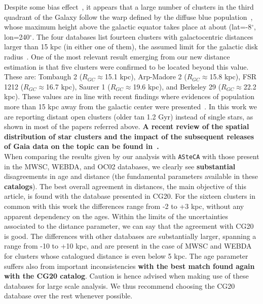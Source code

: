 \documentclass[referee]{aa}
\begin{document}
  Despite some bias effect~\citep[e.g. lower dust absorption, particularly
  along the Fitzgerald window][]{Fitzgerald_1968}, it appears that a large
  number of clusters in the third quadrant of the Galaxy follow the warp defined
  by the diffuse blue population~\citep{Carraro_2005_detection,Moitinho_2006},
  whose maximum height above the galactic equator takes place at about
  (lat=-8$^{\circ}$, lon=240$^{\circ}$.
  The four databases list fourteen clusters with galactocentric distances larger
  than 15 kpc (in either one of them), the assumed limit for the galactic disk
  radius~\citep[see][and references therein]{Carraro_2010}.
  One of the most relevant result emerging from our new distance estimation is
  that five clusters were confirmed to be located beyond this value.
  These are: Tombaugh 2 ($R_{GC}\approx$15.1 kpc), Arp-Madore 2
  ($R_{GC}\approx$15.8 kpc), FSR 1212 ($R_{GC}\approx$16.7 kpc), Saurer 1
  ($R_{GC}\approx$19.6 kpc), and Berkeley 29 ($R_{GC}\approx$22.2 kpc). These
  values are in line with recent findings where evidences of population more than
  15 kpc away from the galactic center were presented~\citep[][and references
  therein]{Liu_2017,Lopez_2018}.
  In this work we are reporting distant open clusters (older tan 1.2 Gyr)
  instead of single stars, as shown in most of the papers referred above.
  \textbf{A recent review of the spatial distribution of star clusters and
  the impact of the subsequent releases of Gaia data on the topic can be found
  in~\cite{Cantat-Gaudin_2022}.}\\

  When comparing the results given by our analysis with \texttt{ASteCA} with
  those present in the MWSC, WEBDA, and OC02 databases, we clearly
  see \textbf{substantial} disagreements in age and distance (the fundamental
  parameters available in these \textbf{catalogs}).
  The best overall agreement in distances, the main objective of this article,
  is found with the database presented in CG20. For the sixteen clusters in
  common with this work the differences range from -2 to +3 kpc, without any
  apparent dependency on the ages. Within the limits of the uncertainties
  associated to the distance parameter, we can say that the agreement with
  CG20 is good.
  The differences with other databases are substantially larger, spanning a
  range from -10 to +10 kpc, and are present in the case of MWSC and WEBDA for
  clusters whose catalogued distance is even below 5 kpc.
  The age parameter suffers also from important inconsistencies \textbf{with
  the best match found again with the CG20 catalog}.
  Caution is hence advised when making use of these databases for large scale
  analysis. We thus recommend choosing the CG20 database over the rest whenever
  possible.
\end{document}
